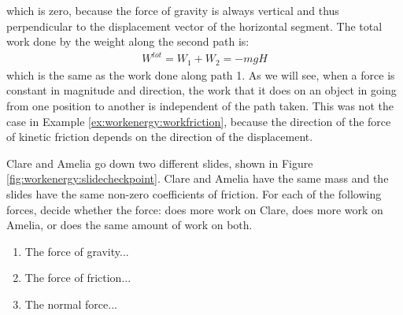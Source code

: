 \begin{example}
which is zero, because the force of gravity is always vertical and thus perpendicular to the displacement vector of the horizontal segment. The total work done by the weight along the second path is:
\begin{align*}
W^{tot} = W_1 + W_2 = -mgH
\end{align*}
which is the same as the work done along path 1. As we will see, when a force is constant in magnitude and direction, the work that it does on an object in going from one position to another is independent of the path taken. This was not the case in Example \ref{ex:workenergy:workfriction}, because the direction of the force of kinetic friction depends on the direction of the displacement. 
\end{example} 

\begin{checkpoint}
Clare and Amelia go down two different slides, shown in Figure \ref{fig:workenergy:slidecheckpoint}. Clare and Amelia have the same mass and the slides have the same non-zero coefficients of friction. 
For each of the following forces, decide whether the force: does more work on Clare, does more work on Amelia, or does the same amount of work on both.
\begin{enumerate}
\item The force of gravity... %
\item The force of friction... %
\item The normal force... %
\end{enumerate}
\end{checkpoint}


